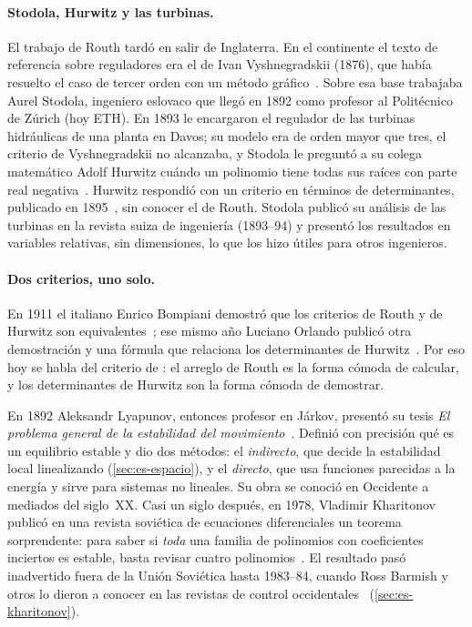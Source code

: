 \paragraph{Stodola, Hurwitz y las turbinas.} El trabajo de Routh tardó en salir de Inglaterra. En el continente el texto de referencia sobre reguladores era el de Ivan Vyshnegradskii (1876), que había resuelto el caso de tercer orden con un método gráfico~\citep{Vys76}. Sobre esa base trabajaba Aurel Stodola, ingeniero eslovaco que llegó en 1892 como profesor al Politécnico de Zúrich (hoy ETH). En 1893 le encargaron el regulador de las turbinas hidráulicas de una planta en Davos; su modelo era de orden mayor que tres, el criterio de Vyshnegradskii no alcanzaba, y Stodola le preguntó a su colega matemático Adolf Hurwitz cuándo un polinomio tiene todas sus raíces con parte real negativa~\citep{Bis89}. Hurwitz respondió con un criterio en términos de determinantes, publicado en 1895~\citep{Hur95}, sin conocer el de Routh. Stodola publicó su análisis de las turbinas en la revista suiza de ingeniería (1893--94) y presentó los resultados en variables relativas, sin dimensiones, lo que los hizo útiles para otros ingenieros.

\paragraph{Dos criterios, uno solo.} En 1911 el italiano Enrico Bompiani demostró que los criterios de Routh y de Hurwitz son equivalentes~\citep{Bom11}; ese mismo año Luciano Orlando publicó otra demostración y una fórmula que relaciona los determinantes de Hurwitz~\citep{Orl11}. Por eso hoy se habla del criterio de : el arreglo de Routh es la forma cómoda de calcular, y los determinantes de Hurwitz son la forma cómoda de demostrar.

\begin{historia}
En 1892 Aleksandr Lyapunov, entonces profesor en Járkov, presentó su tesis \emph{El problema general de la estabilidad del movimiento}~\citep{Lya92}. Definió con precisión qué es un equilibrio estable y dio dos métodos: el \emph{indirecto}, que decide la estabilidad local linealizando (\cref{sec:es-espacio}), y el \emph{directo}, que usa funciones parecidas a la energía y sirve para sistemas no lineales. Su obra se conoció en Occidente a mediados del siglo~XX. Casi un siglo después, en 1978, Vladimir Kharitonov publicó en una revista soviética de ecuaciones diferenciales un teorema sorprendente: para saber si \emph{toda} una familia de polinomios con coeficientes inciertos es estable, basta revisar cuatro polinomios~\citep{Kha78}. El resultado pasó inadvertido fuera de la Unión Soviética hasta 1983--84, cuando Ross Barmish y otros lo dieron a conocer en las revistas de control occidentales~\citep{Bar84} (\cref{sec:es-kharitonov}).
\end{historia}
